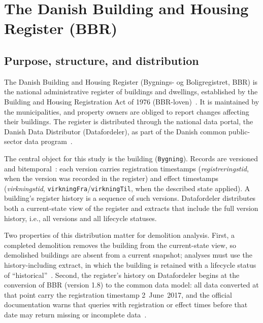 \section{The Danish Building and Housing Register (BBR)}\label{sec:bbr}


\subsection{Purpose, structure, and distribution}\label{sec:bbr-structure}

The Danish Building and Housing Register (Bygnings- og Boligregistret,
BBR) is the national administrative register of buildings and dwellings,
established by the Building and Housing Registration Act of 1976
(BBR-loven)~\cite{bbrloven}. It is maintained by the municipalities, and
property owners are obliged to report changes affecting their buildings.
The register is distributed through the national data portal, the Danish
Data Distributor (Datafordeler), as part of the Danish common
public-sector data program~\cite{datafordeler_grunddatamodel}.

The central object for this study is the building (\texttt{Bygning}).
Records are versioned and bitemporal~\cite{bbr_bitemporalitet}: each
version carries registration timestamps (\emph{registreringstid}, when
the version was recorded in the register) and effect timestamps
(\emph{virkningstid}, \texttt{virkningFra}/\texttt{virkningTil}, when
the described state applied). A building's register history is a
sequence of such versions. Datafordeler distributes both a
current-state view of the register and extracts that include the full
version history, i.e., all versions and all lifecycle statuses.

Two properties of this distribution matter for demolition analysis.
First, a completed demolition removes the building from the
current-state view, so demolished buildings are absent from a current
snapshot; analyses must use the history-including extract, in which the
building is retained with a lifecycle status of
``historical''~\cite{datafordeler_grunddatamodel}. Second, the
register's history on Datafordeler begins at the conversion of BBR
(version 1.8) to the common data model: all data converted at that
point carry the registration timestamp 2~June~2017, and the official
documentation warns that queries with registration or effect times
before that date may return missing or incomplete
data~\cite{bbr_bitemporalitet}.

